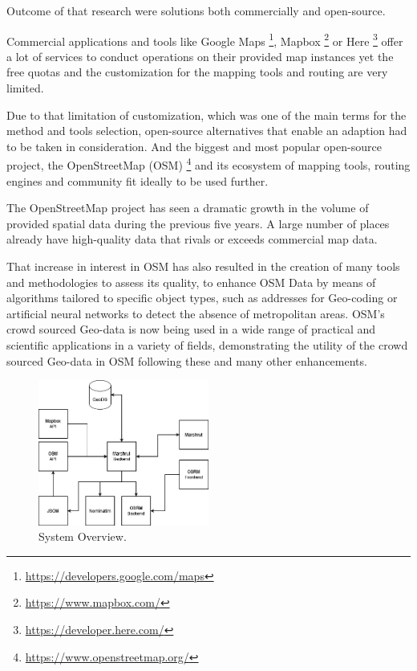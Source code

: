 Outcome of that research were solutions both commercially and open-source.

Commercial applications and tools like Google Maps \footnote{\url{https://developers.google.com/maps}}, Mapbox \footnote{\url{https://www.mapbox.com/}} or Here \footnote{\url{https://developer.here.com/}} offer a lot of services to conduct operations on their provided map instances yet the free quotas and the customization for the mapping tools and routing are very limited. 

Due to that limitation of customization, which was one of the main terms for the method and tools selection, open-source alternatives that enable an adaption had to be taken in consideration. And the biggest and most popular open-source project, the OpenStreetMap (OSM) \footnote{\url{https://www.openstreetmap.org/}} and its ecosystem of mapping tools, routing engines and community fit ideally to be used further.

The OpenStreetMap project has seen a dramatic growth in the volume of provided spatial data during the previous five years. A large number of places already have high-quality data that rivals or exceeds commercial map data. \autocite[]{luxen-vetter-2011}

That increase in interest in OSM has also resulted in the creation of many tools and methodologies to assess its quality, to enhance OSM Data by means of algorithms tailored to specific object types, such as addresses for Geo-coding or artificial neural networks to detect the absence of metropolitan areas. OSM's crowd sourced Geo-data is now being used in a wide range of practical and scientific applications in a variety of fields, demonstrating the utility of the crowd sourced Geo-data in OSM following these and many other enhancements. \autocite[]{JokarArsanjani2015}




\begin{figure}[!ht]
  \centering
  \includegraphics[width=0.5\textwidth]{images/SystemOverview.png}
  \caption{
  System Overview.
  }
  \label{figure:SystemOverview}
\end{figure}


